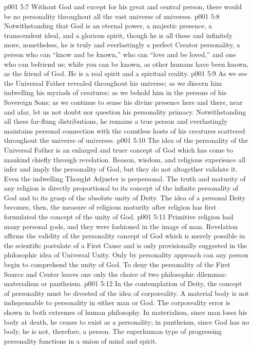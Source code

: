 \vs p001 5:7 \pc Without God and except for his great and central person, there would be no personality throughout all the vast universe of universes. 
\vs p001 5:8 \pc Notwithstanding that God is an eternal power, a majestic presence, a transcendent ideal, and a glorious spirit, though he is all these and infinitely more, nonetheless, he is truly and everlastingly a perfect Creator personality, a person who can “know and be known,” who can “love and be loved,” and one who can befriend us; while you can be known, as other humans have been known, as the friend of God. He is a real spirit and a spiritual reality.
\vs p001 5:9 As we see the Universal Father revealed throughout his universe; as we discern him indwelling his myriads of creatures; as we behold him in the persons of his Sovereign Sons; as we continue to sense his divine presence here and there, near and afar, let us not doubt nor question his personality primacy. Notwithstanding all these far\hyp{}flung distributions, he remains a true person and everlastingly maintains personal connection with the countless hosts of his creatures scattered throughout the universe of universes.
\vs p001 5:10 \pc The idea of the personality of the Universal Father is an enlarged and truer concept of God which has come to mankind chiefly through revelation. Reason, wisdom, and religious experience all infer and imply the personality of God, but they do not altogether validate it. Even the indwelling Thought Adjuster is prepersonal. The truth and maturity of any religion is directly proportional to its concept of the infinite personality of God and to its grasp of the absolute unity of Deity. The idea of a personal Deity becomes, then, the measure of religious maturity after religion has first formulated the concept of the unity of God.
\vs p001 5:11 Primitive religion had many personal gods, and they were fashioned in the image of man. Revelation affirms the validity of the personality concept of God which is merely possible in the scientific postulate of a First Cause and is only provisionally suggested in the philosophic idea of Universal Unity. Only by personality approach can any person begin to comprehend the unity of God. To deny the personality of the First Source and Center leaves one only the choice of two philosophic dilemmas: materialism or pantheism.
\vs p001 5:12 In the contemplation of Deity, the concept of personality must be divested of the idea of corporeality. A material body is not indispensable to personality in either man or God. The corporeality error is shown in both extremes of human philosophy. In materialism, since man loses his body at death, he ceases to exist as a personality; in pantheism, since God has no body, he is not, therefore, a person. The superhuman type of progressing personality functions in a union of mind and spirit.
